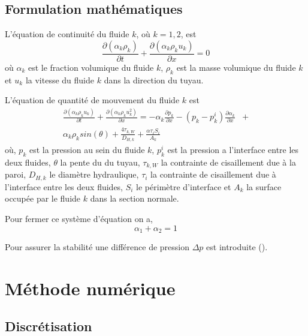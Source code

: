 \documentclass[12pt]{article}
\begin{document}
\subsection{Formulation mathématiques}

L'équation de continuité du fluide \(k\), où \(k = 1,2\), est
\begin{equation}
    \frac{\partial( \alpha _k \rho _k)}{\partial t}  + \frac{\partial (\alpha _k \rho _k u_k) }{\partial x} = 0
    \label{continuity}
\end{equation}
où \(\alpha_k\) est le fraction volumique du fluide \(k\), \(\rho _k\) est la masse volumique du fluide \(k\) et \(u_k\) la vitesse du fluide \(k\) dans la direction du tuyau.

L'équation de quantité de mouvement du fluide \(k\) est 
\begin{equation}
    \begin{split}
        \frac{\partial (\alpha _k \rho _k u_k)}{\partial t} + \frac{\partial (\alpha _k \rho _k u_k^2)}{\partial x} = - \alpha _k \frac{\partial p _k}{\partial x} - (p_k - p_k^i) \frac{\partial \alpha _k}{\partial x} &+ \\
        \alpha _k \rho _k sin(\theta) + \frac{4 \tau _{k, W}}{D_{H, k}} + \frac{\alpha \tau _i S _i}{A _k}
    \end{split}
    \label{momentum}
\end{equation}
où, \(p_k\) est la pression au sein du fluide \(k\), \(p_k^i\) est la pression a l'interface entre les deux fluides, \(\theta\) la pente du du tuyau, \(\tau _{k, W}\) la contrainte de cisaillement due à la paroi, \(D_{H, k}\) le diamètre hydraulique, \(\tau _i\) la contrainte de cisaillement due à l'interface entre les deux fluides, \(S_i\) le périmètre d'interface et \(A_k\) la surface occupée par le fluide \(k\) dans la section normale.

Pour fermer ce système d'équation on a,
\begin{equation}
    \alpha_1 + \alpha_2 = 1
    \label{closur}
\end{equation}

Pour assurer la stabilité une différence de pression \(\Delta p \) est introduite (\cite{Wang15}).



\section{Méthode numérique}
\subsection{Discrétisation}
\end{document}
